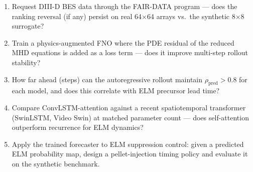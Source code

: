 \begin{enumerate}[leftmargin=1.6em,itemsep=0.2em,topsep=0.2em,label=Q\arabic*.]
\item Request DIII-D BES data through the FAIR-DATA program --- does the ranking reversal (if any) persist on real 64$\times$64 arrays vs.\ the synthetic 8$\times$8 surrogate?
\item Train a physics-augmented FNO where the PDE residual of the reduced MHD equations is added as a loss term --- does it improve multi-step rollout stability?
\item How far ahead (steps) can the autoregressive rollout maintain $\rho_\mathrm{pred} > 0.8$ for each model, and does this correlate with ELM precursor lead time?
\item Compare ConvLSTM-attention against a recent spatiotemporal transformer (SwinLSTM, Video Swin) at matched parameter count --- does self-attention outperform recurrence for ELM dynamics?
\item Apply the trained forecaster to ELM suppression control: given a predicted ELM probability map, design a pellet-injection timing policy and evaluate it on the synthetic benchmark.
\end{enumerate}

